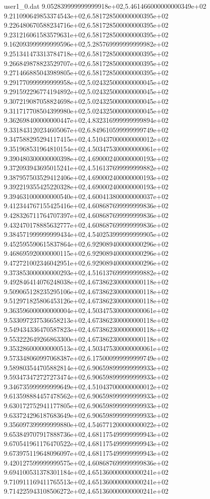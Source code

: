 \begin{filecontents}{user1_0.dat}
9.052839999999999918e+02,5.461466000000000349e+02
9.211090649853374543e+02,6.581728500000000395e+02
9.226480670588234716e+02,6.581728500000000395e+02
9.231216061583579631e+02,6.581728500000000395e+02
9.162093999999999596e+02,5.285769999999999982e+02
9.251341473313784718e+02,6.581728500000000395e+02
9.266849878823529707e+02,6.581728500000000395e+02
9.271466885043989805e+02,6.581728500000000395e+02
9.291770999999999958e+02,5.024325000000000045e+02
9.291592296774194892e+02,5.024325000000000045e+02
9.307219087058824698e+02,5.024325000000000045e+02
9.311717708504399980e+02,5.024325000000000045e+02
9.362698400000000447e+02,4.832316999999999894e+02
9.331843120234605067e+02,6.849610599999999749e+02
9.347588295294117415e+02,4.510437000000000012e+02
9.351968531964810154e+02,4.503475300000000061e+02
9.390480300000000398e+02,4.690002400000000193e+02
9.372093943695015241e+02,4.516137699999999882e+02
9.387957503529412406e+02,4.690002400000000193e+02
9.392219355425220328e+02,4.690002400000000193e+02
9.394631000000000540e+02,4.600413800000000037e+02
9.412344767155425416e+02,4.608687699999999836e+02
9.428326711764707397e+02,4.608687699999999836e+02
9.432470178885632777e+02,4.608687699999999836e+02
9.384571999999999434e+02,4.540253999999999905e+02
9.452595590615837864e+02,6.929089400000000296e+02
9.468695920000000115e+02,6.929089400000000296e+02
9.472721002346042951e+02,6.929089400000000296e+02
9.373853000000000293e+02,4.516137699999999882e+02
9.492846414076248038e+02,4.673862300000000118e+02
9.509065128235295106e+02,4.673862300000000118e+02
9.512971825806453126e+02,4.673862300000000118e+02
9.363596000000000004e+02,4.503475300000000061e+02
9.533097237536658213e+02,4.673862300000000118e+02
9.549434336470587823e+02,4.673862300000000118e+02
9.553222649266863300e+02,4.673862300000000118e+02
9.353286000000000513e+02,4.503475300000000061e+02
9.573348060997068387e+02,6.175000999999999749e+02
9.589803544705882814e+02,6.906598999999999933e+02
9.593473472727273474e+02,6.906598999999999933e+02
9.346735999999999649e+02,4.510437000000000012e+02
9.613598884457478562e+02,6.906598999999999933e+02
9.630172752941177805e+02,6.906598999999999933e+02
9.633724296187683649e+02,6.906598999999999933e+02
9.356097399999999880e+02,4.546771200000000022e+02
9.653849707917888736e+02,4.681175499999999943e+02
9.670541961176470522e+02,4.681175499999999943e+02
9.673975119648096097e+02,4.681175499999999943e+02
9.420127599999999575e+02,4.608687699999999836e+02
9.694100531378301184e+02,4.651360000000000241e+02
9.710911169411765513e+02,4.651360000000000241e+02
9.714225943108506272e+02,4.651360000000000241e+02

\end{filecontents}
